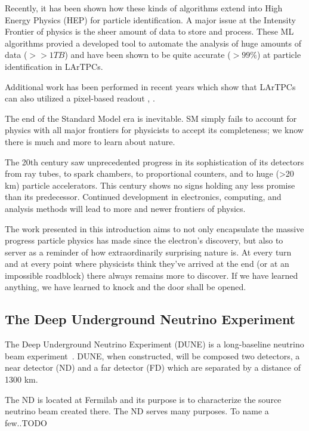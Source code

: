 Recently, it has been shown how these kinds of algorithms extend into High Energy Physics (HEP) for particle identification.
A major issue at the Intensity Frontier of physics is the sheer amount of data to store and process.
These ML algorithms provied a developed tool to automate the analysis of huge amounts of data ($>> 1 TB$) and have been shown to be quite accurate ($>99\%$) at particle identification in LArTPCs.


Additional work has been performed in recent years which show that LArTPCs can also utilized a pixel-based readout \citep{larpix:Dwyer_2018}, \citep{Asaadi_2018}.

The end of the Standard Model era is inevitable.
SM simply fails to account for physics with all major frontiers for physicists to accept its completeness; we know there is much and more to learn about nature.

The 20th century saw unprecedented progress in its sophistication of its detectors from ray tubes, to spark chambers, to proportional counters, and to huge (>20 km) particle accelerators.
This century shows no signs holding any less promise than its predecessor.
Continued development in electronics, computing, and analysis methods will lead to more and newer frontiers of physics.

The work presented in this introduction aims to not only encapsulate the massive progress particle physics has made since the electron's discovery, but also to server as a reminder of how extraordinarily surprising nature is.
At every turn and at every point where physicists think they've arrived at the end (or at an impossible roadblock) there always remains more to discover.
If we have learned anything, we have learned to knock and the door shall be opened.


\subsection{The Deep Underground Neutrino Experiment}

The Deep Underground Neutrino Experiment (DUNE) is a long-baseline neutrino beam experiment~\citep{DUNE_TDR_V1_Abi_2020, DUNE_FD_TDRv2_2020, DUNE_TDRv3_Abi_2020, DUNE-FD_TDRv4:Abi_2020}.
DUNE, when constructed, will be composed two detectors, a near detector (ND) and a far detector (FD) which are separated by a distance of 1300 km.

The ND is located at Fermilab and its purpose is to characterize the source neutrino beam created there.
The ND serves many purposes.
To name a few..TODO

